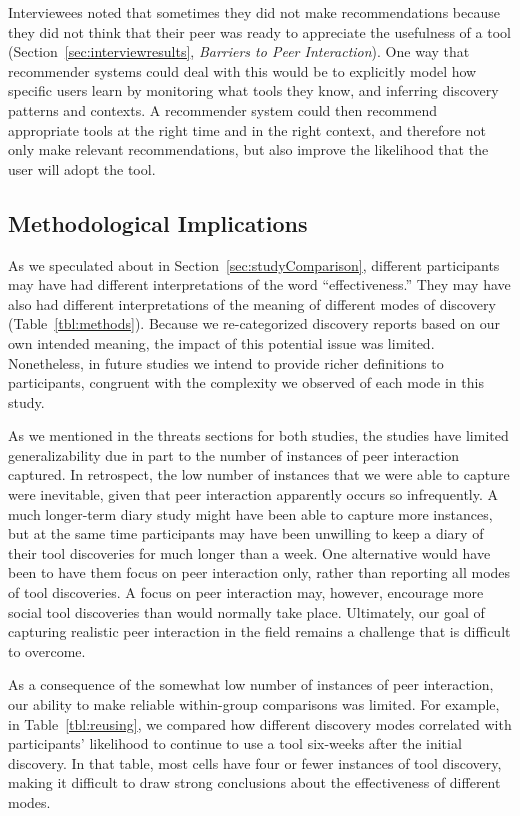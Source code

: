 \documentclass[smallextended]{svjour3}
\newcommand\discovery{peer interaction\xspace}
\newcommand\context{mode\xspace}
\newcommand\contexts{modes\xspace}
\begin{document}
Interviewees noted that sometimes they did not make recommendations because they
did not think that their peer was ready to appreciate the usefulness of a tool 
(Section~\ref{sec:interviewresults}, \textit{Barriers to Peer Interaction}).
One way that recommender systems could deal with this would be to explicitly
model how specific users learn by monitoring what tools they know,
and inferring discovery patterns and contexts. 
A recommender system could then recommend appropriate tools at the right time
and in the right context, and therefore not only make relevant
recommendations, but also improve the likelihood that the user will
adopt the tool.

\subsection{Methodological Implications}

As we speculated about in Section~\ref{sec:studyComparison},
different participants may have had different interpretations of the word
``effectiveness.''
They may have also had different interpretations of 
the meaning of different \contexts of discovery (Table~\ref{tbl:methods}).
Because we re-categorized discovery reports based on our own intended meaning, 
the impact of this potential issue was limited.
Nonetheless, in future studies we intend to provide richer
definitions to participants, congruent with the complexity we observed of each
\context in this study.

As we mentioned in the threats sections for both studies,
the studies have limited generalizability due in part to 
the number of instances of \discovery captured.
In retrospect, the low number of instances that we were able to capture were 
inevitable, given that \discovery apparently occurs so infrequently.
A much longer-term diary study might have been able to capture more instances,
but at the same time participants may have been unwilling to keep a diary
of their tool discoveries for much longer than a week.
One alternative would have been to have them focus on \discovery only,
rather than reporting all \contexts of tool discoveries.
A focus on \discovery may, however, encourage more social tool discoveries than
would normally take place.
Ultimately, our goal of capturing realistic \discovery in the field remains a 
challenge that is difficult to overcome.

As a consequence of the somewhat low number of instances of \discovery,
our ability to make reliable within-group comparisons was limited.
For example, in Table~\ref{tbl:reusing}, we compared how different 
discovery \contexts correlated with participants' likelihood to continue to use a tool
six-weeks after the initial discovery.
In that table, most cells have four or fewer instances of tool discovery,
making it difficult to draw strong conclusions about the effectiveness of 
different \contexts.
\end{document}
